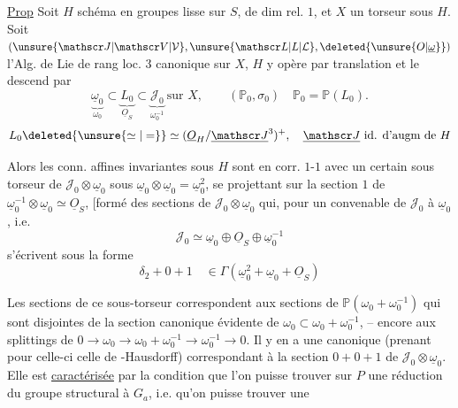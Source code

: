 \uline{Prop} 
Soit $H$ schéma en groupes lisse sur $S$,
de dim rel. $1$, et $X$ un torseur sous $H$.
Soit $(\unsure{\mathscr J|\mathscr V|\mathcal V},\unsure{\mathscr L|L|\mathcal L},\deleted{\unsure{O|\underline\omega}})$ l'Alg. de Lie de rang loc. $3$ canonique
sur $X$, 
$H$ y opère par translation et le descend
par
\[
\underbrace{\underline\omega_0}_{\omega_0}\subset
\underbrace{L_0}_{\underline O_S}\subset
\underbrace{\mathscr J_0}_{\omega_0^{-1}}\ \text{sur } X,\qquad
(\mathbb P_0,\sigma_0)\quad \mathbb P_0=\mathbb P(L_0).
\]
\[
L_0\deleted{\unsure{\simeq|=}}\simeq(\underline O_H/\underline{\mathscr J}^3)^+,\quad
\underline{\mathscr J}\ \text{id. d'augm de }H
\]

Alors les conn. affines  invariantes sous $H$
sont en corr. $1$-$1$ avec un certain sous
torseur  de $\mathscr J_0\otimes\underline\omega_0$ sous $\underline\omega_0\otimes\underline\omega_0=\underline\omega_0^2$,
se projettant sur la section $1$ de $\underline\omega_0^{-1}\otimes\underline\omega_0\simeq\underline O_S$,
[formé des sections  de $\mathscr J_0\otimes\underline\omega_0$ qui, pour
un  convenable de $\mathscr J_0$  à $\underline\omega_0$,  i.e.
\[
\mathscr J_0\simeq\underline\omega_0\oplus\underline O_S\oplus\underline\omega_0^{-1}
\]
s'écrivent sous la forme
\[
\delta_2+0+1\quad\in\Gamma(\underline\omega_0^2+\underline\omega_0+\underline O_S)
\]

Les sections de ce sous-torseur correspondent
aux sections de $\mathbb P(\omega_0+\omega_0^{-1})$ qui sont disjointes
de la section canonique évidente de
$\omega_0\subset\omega_0+\omega_0^{-1}$, -- encore aux splittings
de $0\longrightarrow\omega_0\longrightarrow\omega_0+\omega_0^{-1}\longrightarrow\omega_0^{-1}\longrightarrow0$.
Il y en a une canonique (prenant pour celle-ci
celle de -Hausdorff) correspondant à la section $0+0+1$ de
$\mathscr J_0\otimes\underline\omega_0$. Elle est \uline{caractérisée}  par la condition
que  l'on puisse trouver sur
$P$ une réduction  du groupe structural
à $G_a$, i.e. qu'on puisse trouver une
